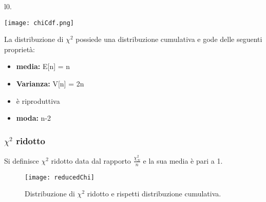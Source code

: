 \begin{wrapfigure}[7]{l}{0.\textwidth}
\centering

\texttt{[image: chiCdf.png]}	

\end{wrapfigure}

\noindent La distribuzione di $\chi^2$ possiede una distribuzione cumulativa e gode delle seguenti propriet\`{a}:

\begin{itemize}
	\item \textbf{media:} E[n] = n
	\item \textbf{Varianza:} V[n] = 2n
	\item \`{e} riproduttiva
	\item \textbf{moda:} n-2
	\end{itemize}
	
\subsubsection{$\chi^2$ ridotto}

Si definisce $\chi^2$ ridotto data dal rapporto $\frac{\chi^2_N}{n}$ e la sua media \`{e} pari a 1.

 
\begin{figure}[ht]
\vspace{0.in}
\texttt{[image: reducedChi]}	
\centering
\vspace{0.in}
\caption{Distribuzione di $\chi^2$ ridotto e rispetti distribuzione cumulativa.}
\end{figure}

